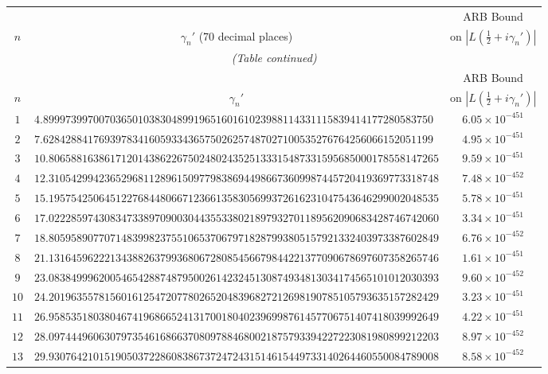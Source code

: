 \documentclass[12pt,reqno]{amsart}
\theoremstyle{remark}
\begin{document}
\renewcommand{\arraystretch}{1.1}
\setlength{\LTleft}{\fill}
\setlength{\LTright}{\fill}
\footnotesize
\begin{longtable}{clc}
\toprule
 & & ARB Bound \\
$n$ & \multicolumn{1}{c}{$\gamma_n'$ (70 decimal places)} & on $|L(\tfrac{1}{2}+i\gamma_n')|$ \\
\midrule
\endfirsthead
\multicolumn{3}{c}{\small\itshape (Table continued)} \\
\toprule
 & & ARB Bound \\
$n$ & \multicolumn{1}{c}{$\gamma_n'$} & on $|L(\tfrac{1}{2}+i\gamma_n')|$ \\
\midrule
\endhead
\bottomrule
\endlastfoot
$1$ & $4.8999739970070365010383048991965160161023988114331115839414177280583750$ & $6.05\times 10^{-451}$ \\
$2$ & $7.6284288417693978341605933436575026257487027100535276764256066152051199$ & $4.95\times 10^{-451}$ \\
$3$ & $10.8065881638617120143862267502480243525133315487331595685000178558147265$ & $9.59\times 10^{-451}$ \\
$4$ & $12.3105429942365296811289615097798386944986673609987445720419369773318748$ & $7.48\times 10^{-452}$ \\
$5$ & $15.1957542506451227684480667123661358305699372616231047543646299002048535$ & $5.78\times 10^{-451}$ \\
$6$ & $17.0222859743083473389709003044355338021897932701189562090683428746742060$ & $3.34\times 10^{-451}$ \\
$7$ & $18.8059589077071483998237551065370679718287993805157921332403973387602849$ & $6.76\times 10^{-452}$ \\
$8$ & $21.1316459622213438826379936806728085456679844221377090678697607358265746$ & $1.61\times 10^{-451}$ \\
$9$ & $23.0838499962005465428874879500261423245130874934813034174565101012030393$ & $9.60\times 10^{-452}$ \\
$10$ & $24.2019635578156016125472077802652048396827212698190785105793635157282429$ & $3.23\times 10^{-451}$ \\
$11$ & $26.9585351803804674196866524131700180402396998761457706751407418039992649$ & $4.22\times 10^{-451}$ \\
$12$ & $28.0974449606307973546168663708097884680021875793394227223081980899212203$ & $8.97\times 10^{-452}$ \\
$13$ & $29.9307642101519050372286083867372472431514615449733140264460550084789008$ & $8.58\times 10^{-452}$ \\

\end{longtable}
\end{document}
